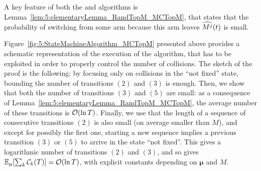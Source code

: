 \begin{smallproof}
  A key feature of both the \RandTopM{} and \MCTopM{} algorithms is Lemma~\ref{lem:5:elementaryLemma_RandTopM_MCTopM}, that states that the probability of switching from some arm because this arm leaves $\widehat{M^j}(t)$ is small.

  Figure~\ref{fig:5:StateMachineAlgorithm_MCTopM} presented above provides a schematic representation of the execution of the \MCTopM{} algorithm, that has to be exploited in order to properly control the number of collisions.
  The sketch of the proof is the following: by focusing only on collisions in the ``not fixed'' state, bounding the number of transitions $(2)$ and $(3)$ is enough.
  Then, we show that both the number of transitions $(3)$ and $(5)$ are small: as a consequence of Lemma~\ref{lem:5:elementaryLemma_RandTopM_MCTopM}, the average number of these transitions is $\mathop{}\mathopen{}\mathcal{O}\mathopen{}\left(\ln T\right)$.
  Finally, we use that the length of a sequence of consecutive transitions $(2)$ is also small (on average smaller than $M$), and except for possibly the first one, starting a new sequence implies a previous transition $(3)$ or $(5)$ to arrive in the state ``not fixed''. This gives a logarithmic number of transitions $(2)$ and $(3)$, and so gives $\mathbb{E}_{\mu}[\sum_k\mathcal{C}_k(T)] = \mathop{}\mathopen{}\mathcal{O}\mathopen{}\left(\ln T\right)$,
  with explicit constants depending on $\boldsymbol{\mu}$ and $M$.



\end{smallproof}
